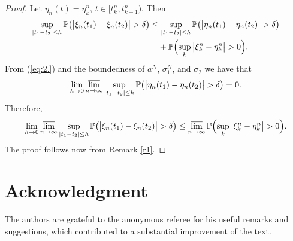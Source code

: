 \documentclass[numbers,compress,v1.0.1]{vmsta}
\theoremstyle{remark}
\renewcommand{\P}{\mathbb P}
\newcommand*{\abs}[1]{\left\lvert#1\right\rvert}
\begin{document}
%
\begin{proof}
Let $\eta_n(t)=\eta_k^n$, $t\in[t_k^n,t_{k+1}^n)$. Then
%
\begin{align*}
\sup_{\abs{t_1-t_2}\leq h} \P\bigl(\big|\xi_n(t_1) -
\xi_n(t_2) \big| >\delta \bigr)&\leq\sup_{\abs{ t_1-t_2 } \leq h}
\P\bigl(\big| \eta_n(t_1) -\eta_n(t_2)
\big| >\delta\bigr)
\\
&\quad+ \P\Bigl(\sup_k \big| \xi_k^n -
\eta_k^n \big| >0\Bigr).
\end{align*}
%
From (\ref{eq:2.}) and the boundedness of $a^N$, $\sigma_1^N$, and
$\sigma_2$ we have that
%
\[
\lim_{h\rightarrow0}\varlimsup_{n\rightarrow\infty}\sup_{\abs
{t_1-t_2} \leq h}
\P\bigl(\big|\eta_n(t_1) -\eta_n(t_2)\big|
>\delta\bigr)=0.
\]
%
Therefore,
%
\[
\lim_{h\rightarrow0}\varlimsup_{n\rightarrow\infty}\sup_{\abs
{t_1-t_2} \leq h}
\P\bigl(\big| \xi_n(t_1) -\xi_n(t_2)
\big| >\delta\bigr) \leq \varlimsup_{n\rightarrow\infty}\P\Bigl(\sup_k
\big| \xi_k^n -\eta_k^n \big| >0
\Bigr).
\]
%
The proof follows now from Remark \ref{r1}.
\end{proof}

\section*{Acknowledgment}
The authors are grateful to the anonymous referee for his useful
remarks and suggestions, which contributed to a substantial improvement
of the text.
\end{document}
